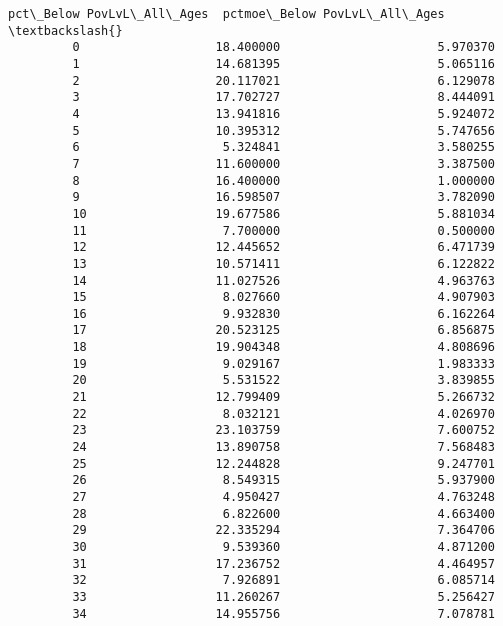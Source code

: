 \documentclass[11pt]{article}
\begin{document}
\begin{Verbatim}[commandchars=\\\{\}]
             pct\_Below PovLvL\_All\_Ages  pctmoe\_Below PovLvL\_All\_Ages  \textbackslash{}
         0                   18.400000                      5.970370   
         1                   14.681395                      5.065116   
         2                   20.117021                      6.129078   
         3                   17.702727                      8.444091   
         4                   13.941816                      5.924072   
         5                   10.395312                      5.747656   
         6                    5.324841                      3.580255   
         7                   11.600000                      3.387500   
         8                   16.400000                      1.000000   
         9                   16.598507                      3.782090   
         10                  19.677586                      5.881034   
         11                   7.700000                      0.500000   
         12                  12.445652                      6.471739   
         13                  10.571411                      6.122822   
         14                  11.027526                      4.963763   
         15                   8.027660                      4.907903   
         16                   9.932830                      6.162264   
         17                  20.523125                      6.856875   
         18                  19.904348                      4.808696   
         19                   9.029167                      1.983333   
         20                   5.531522                      3.839855   
         21                  12.799409                      5.266732   
         22                   8.032121                      4.026970   
         23                  23.103759                      7.600752   
         24                  13.890758                      7.568483   
         25                  12.244828                      9.247701   
         26                   8.549315                      5.937900   
         27                   4.950427                      4.763248   
         28                   6.822600                      4.663400   
         29                  22.335294                      7.364706   
         30                   9.539360                      4.871200   
         31                  17.236752                      4.464957   
         32                   7.926891                      6.085714   
         33                  11.260267                      5.256427   
         34                  14.955756                      7.078781   

\end{Verbatim}
\end{document}
